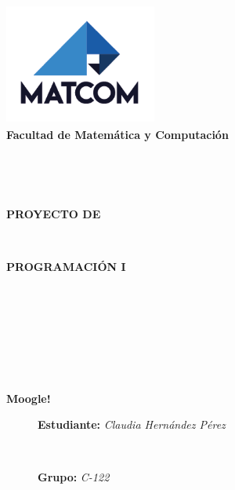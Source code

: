 \documentclass[letterpaper]{article}
\begin{document}
\begin{flushright}
	\includegraphics[width=5cm, height=4cm]{logoMATCOM.png}\\
	{\scriptsize \textbf{Facultad de Matemática y Computación}}
\end{flushright}

\

\

\begin{center}
	\textbf{{\Huge PROYECTO DE }}
	
	\

	\textbf{{\Huge PROGRAMACIÓN I}}
	\

	\

	\

	\

	\

	\textbf{{\Huge Moogle!}}
\end{center}
\begin{figure}[b]
	\begin{flushleft}
		{\huge \textbf{Estudiante:} \textit{Claudia Hernández Pérez}}

		\
	
		{\LARGE \textbf{Grupo:} \textit{C-122}}
	\end{flushleft}
\end{figure}
\end{document}
